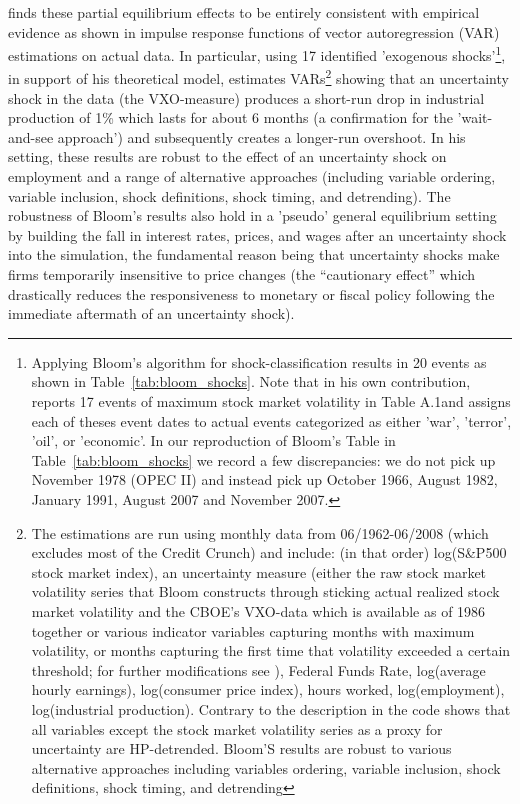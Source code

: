 \documentclass[a4paper,11pt,listof=nochaptergap,oneside,pointednumbers,bibtotoc,bigheadings,liststotoc]{scrbook}
\theoremstyle{mysatz}
\theoremstyle{mydefinition}
\theoremstyle{mytheorem}
\theoremstyle{mybemerkung}
\begin{document}
\citet{bloom:09} finds these partial equilibrium effects to be entirely consistent with empirical evidence as shown in impulse response functions of vector autoregression (VAR) estimations on actual data. In particular, using 17 identified 'exogenous shocks'\footnote{Applying Bloom's algorithm for shock-classification results in 20 events as shown in Table~\ref{tab:bloom_shocks}. Note that in his own contribution, \citet[p. 676]{bloom:09} reports 17 events of maximum stock market volatility in Table A.1and assigns each of theses event dates to actual events categorized as either 'war', 'terror', 'oil', or 'economic'. In our reproduction of Bloom's Table in Table~\ref{tab:bloom_shocks} we record a few discrepancies: we do not pick up November 1978 (OPEC II) and instead pick up October 1966, August 1982, January 1991, August 2007 and November 2007. }, in support of his theoretical model, \citet{bloom:09} estimates VARs\footnote{The estimations are run using monthly data from 06/1962-06/2008 (which excludes most of the Credit Crunch) and include: (in that order) log(S\&P500 stock market index), an uncertainty measure (either the raw stock market volatility series that Bloom constructs through sticking actual realized stock market volatility and the CBOE's VXO-data which is available as of 1986 together or various indicator variables capturing months with maximum volatility, or months capturing the first time that volatility exceeded a certain threshold; for further modifications see \citealp{bloom:09}), Federal Funds Rate, log(average hourly earnings), log(consumer price index), hours worked, log(employment), log(industrial production). Contrary to the description in \citet{bloom:09} the code shows that all variables except the stock market volatility series as a proxy for uncertainty are HP-detrended. Bloom'S results are robust to various alternative approaches including variables ordering, variable inclusion, shock definitions, shock timing, and detrending} showing that an uncertainty shock in the data (the VXO-measure) produces a short-run drop in industrial production of 1\% which lasts for about 6 months (a confirmation for the ’wait-and-see approach’) and subsequently creates a longer-run overshoot. In his setting, these results are robust to the effect of an uncertainty shock on employment and a range of alternative approaches (including variable ordering, variable inclusion, shock definitions, shock timing, and detrending). The robustness of Bloom's results also hold in a 'pseudo' general equilibrium setting by building the fall in interest rates, prices, and wages after an uncertainty shock into the simulation, the fundamental reason being that uncertainty shocks make firms temporarily insensitive to price changes (the ``cautionary effect'' which drastically reduces the responsiveness to monetary or fiscal policy following the immediate aftermath of an uncertainty shock).
\end{document}

